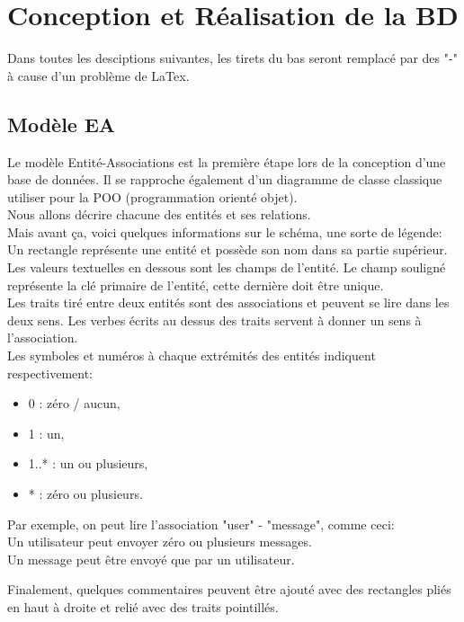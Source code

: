 \documentclass[
    iai, %
    il, %
]{heig-tb}
\begin{document}
\chapter{Conception et Réalisation de la BD}

Dans toutes les desciptions suivantes, les tirets du bas seront remplacé par des "-" à cause d'un problème de LaTex.

\section{Modèle EA}
Le modèle Entité-Associations est la première étape lors de la conception d'une base de données. Il se rapproche également d'un diagramme de classe classique utiliser pour la POO (programmation orienté objet).\\
Nous allons décrire chacune des entités et ses relations.\\
Mais avant ça, voici quelques informations sur le schéma, une sorte de légende:\\
Un rectangle représente une entité et possède son nom dans sa partie supérieur.\\
Les valeurs textuelles en dessous sont les champs de l'entité. Le champ souligné représente la clé primaire de l'entité, cette dernière doit être unique.\\
Les traits tiré entre deux entités sont des associations et peuvent se lire dans les deux sens. Les verbes écrits au dessus des traits servent à donner un sens à l'association.\\
Les symboles et numéros à chaque extrémités des entités indiquent respectivement:
\begin{itemize}
    \item 0 : zéro / aucun,
    \item 1 : un,
    \item 1..* : un ou plusieurs,
    \item * : zéro ou plusieurs.
\end{itemize}

Par exemple, on peut lire l'association "user" - "message", comme ceci:\\
Un utilisateur peut envoyer zéro ou plusieurs messages.\\
Un message peut être envoyé que par un utilisateur.

Finalement, quelques commentaires peuvent être ajouté avec des rectangles pliés en haut à droite et relié avec des traits pointillés.
\end{document}
